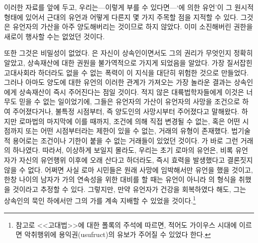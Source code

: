 이러한 자료를 앞에 두고,
우리는---이렇게 부를 수 있다면---`에 의한 유언'이
그 원시적 형태에 있어서 근대의 유언과 어떻게 다른지 몇 가지 주목할 점을
지적할 수 있다.
그것은 유언자의 가산을 아주 양도해버리는 것이므로
하지 않았다.
이미 소진해버린 권한을 새로이 행사할 수는 없었던 것이다.

또한 그것은 비밀성이 없었다.
은 자신이 상속인이면서도 그의 권리가 무엇인지 정확히 알았고,
상속재산에 대한 권원을 불가역적으로 가지게 되었음을 알았다.
가장 질서잡힌 고대사회라 하더라도 없을 수 없는 폭력이 이 지식을 대단히
위험한 것으로 만들었다.
그러나 아마도 양도에 대한 유언의 이러한 관계가 가져오는 가장 놀라운 결과는
상속인에게 상속재산이 즉시 주어진다는 점일 것이다.
적지 않은 대륙법학자들에게 이것은 너무도 믿을 수 없는 일이었기에,
그들은 유언자의 가산이 유언자의 사망을 조건으로 하여 주어졌다거나,
불특정 시점부터, 즉 양도인의 사망시부터 주어졌다고 말해왔다.
하지만 로마법의 마지막에 이를 때까지,
조건에 의해 직접 변경될 수 없는, 혹은
어떤 시점까지 또는 어떤 시점부터라는 제한이 있을 수 없는,
거래의 유형이 존재했다.
법기술적 용어로는 조건이나
기한이 붙을 수 없는 거래들이 있었던 것이다.
가 바로 그런 거래의 하나였다.
따라서, 이상하게 보일지 몰라도, 우리는 초기 로마의 유언은,
비록 유언자가 자신의 유언행위 이후에 오래 산다고 하더라도,
즉시 효력을 발생했다고 결론짓지 않을 수 없다.
어쩌면 사실 로마 시민들은 원래 사망에 임박해서만 유언을 했을 것이고,
한창 나이의 남자가 가의 연속성을 위한 대비를 할 때는
유언이 아니라 의 형식을 취했을 것이라고 추정할 수 있다.
그렇지만, 만약 유언자가 건강을 회복하였다 해도,
그는 상속인의 묵인 하에서만 그의 가를 계속 지배할 수 있었을 것이다.\footnote{%
  참고로 <<고대법>>에 대한 폴록의 주석에 따르면,
  적어도 가이우스 시대에 이르면
  악취행위에 용익권(usufruct)의 유보가 주어질 수 있었다 한다.
  }


